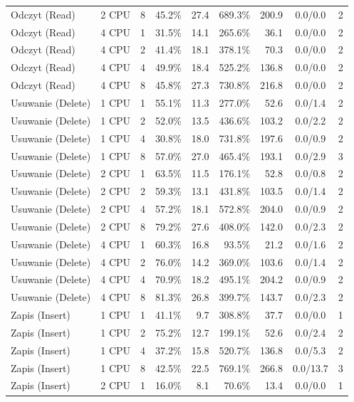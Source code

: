 \begin{table}[ht]
{\begin{tabular}{llcrrrrcc}
Odczyt (Read) & 2 CPU & 8 & 45.2\% & 27.4 & 689.3\% & 200.9 & 0.0/0.0 & 2 \\
Odczyt (Read) & 4 CPU & 1 & 31.5\% & 14.1 & 265.6\% & 36.1 & 0.0/0.0 & 2 \\
Odczyt (Read) & 4 CPU & 2 & 41.4\% & 18.1 & 378.1\% & 70.3 & 0.0/0.0 & 2 \\
Odczyt (Read) & 4 CPU & 4 & 49.9\% & 18.4 & 525.2\% & 136.8 & 0.0/0.0 & 2 \\
Odczyt (Read) & 4 CPU & 8 & 45.8\% & 27.3 & 730.8\% & 216.8 & 0.0/0.0 & 2 \\
Usuwanie (Delete) & 1 CPU & 1 & 55.1\% & 11.3 & 277.0\% & 52.6 & 0.0/1.4 & 2 \\
Usuwanie (Delete) & 1 CPU & 2 & 52.0\% & 13.5 & 436.6\% & 103.2 & 0.0/2.2 & 2 \\
Usuwanie (Delete) & 1 CPU & 4 & 30.8\% & 18.0 & 731.8\% & 197.6 & 0.0/0.9 & 2 \\
Usuwanie (Delete) & 1 CPU & 8 & 57.0\% & 27.0 & 465.4\% & 193.1 & 0.0/2.9 & 3 \\
Usuwanie (Delete) & 2 CPU & 1 & 63.5\% & 11.5 & 176.1\% & 52.8 & 0.0/0.8 & 2 \\
Usuwanie (Delete) & 2 CPU & 2 & 59.3\% & 13.1 & 431.8\% & 103.5 & 0.0/1.4 & 2 \\
Usuwanie (Delete) & 2 CPU & 4 & 57.2\% & 18.1 & 572.8\% & 204.0 & 0.0/0.9 & 2 \\
Usuwanie (Delete) & 2 CPU & 8 & 79.2\% & 27.6 & 408.0\% & 142.0 & 0.0/2.3 & 2 \\
Usuwanie (Delete) & 4 CPU & 1 & 60.3\% & 16.8 & 93.5\% & 21.2 & 0.0/1.6 & 2 \\
Usuwanie (Delete) & 4 CPU & 2 & 76.0\% & 14.2 & 369.0\% & 103.6 & 0.0/1.4 & 2 \\
Usuwanie (Delete) & 4 CPU & 4 & 70.9\% & 18.2 & 495.1\% & 204.2 & 0.0/0.9 & 2 \\
Usuwanie (Delete) & 4 CPU & 8 & 81.3\% & 26.8 & 399.7\% & 143.7 & 0.0/2.3 & 2 \\
Zapis (Insert) & 1 CPU & 1 & 41.1\% & 9.7 & 308.8\% & 37.7 & 0.0/0.0 & 1 \\
Zapis (Insert) & 1 CPU & 2 & 75.2\% & 12.7 & 199.1\% & 52.6 & 0.0/2.4 & 2 \\
Zapis (Insert) & 1 CPU & 4 & 37.2\% & 15.8 & 520.7\% & 136.8 & 0.0/5.3 & 2 \\
Zapis (Insert) & 1 CPU & 8 & 42.5\% & 22.5 & 769.1\% & 266.8 & 0.0/13.7 & 3 \\
Zapis (Insert) & 2 CPU & 1 & 16.0\% & 8.1 & 70.6\% & 13.4 & 0.0/0.0 & 1 \\

\end{tabular}}
\end{table}
